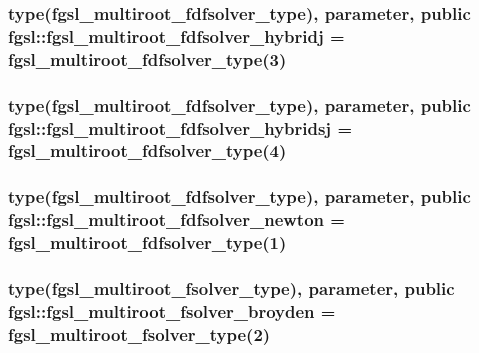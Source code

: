 \hypertarget{classfgsl_a3a3728bb3d1d1a699c08a4a02af2eac1}{
\subsubsection[{fgsl\-\_\-multiroot\-\_\-fdfsolver\-\_\-hybridj}]{\setlength{\rightskip}{0pt plus 5cm}type({\bf fgsl\-\_\-multiroot\-\_\-fdfsolver\-\_\-type}), parameter, public fgsl\-::fgsl\-\_\-multiroot\-\_\-fdfsolver\-\_\-hybridj = {\bf fgsl\-\_\-multiroot\-\_\-fdfsolver\-\_\-type}(3)}}\label{classfgsl_a3a3728bb3d1d1a699c08a4a02af2eac1}
\hypertarget{classfgsl_a4d6c0533915b025bbb86fb16727964ca}{
\subsubsection[{fgsl\-\_\-multiroot\-\_\-fdfsolver\-\_\-hybridsj}]{\setlength{\rightskip}{0pt plus 5cm}type({\bf fgsl\-\_\-multiroot\-\_\-fdfsolver\-\_\-type}), parameter, public fgsl\-::fgsl\-\_\-multiroot\-\_\-fdfsolver\-\_\-hybridsj = {\bf fgsl\-\_\-multiroot\-\_\-fdfsolver\-\_\-type}(4)}}\label{classfgsl_a4d6c0533915b025bbb86fb16727964ca}
\hypertarget{classfgsl_ae80cc34511a1cc786b0fb5617e3929ed}{
\subsubsection[{fgsl\-\_\-multiroot\-\_\-fdfsolver\-\_\-newton}]{\setlength{\rightskip}{0pt plus 5cm}type({\bf fgsl\-\_\-multiroot\-\_\-fdfsolver\-\_\-type}), parameter, public fgsl\-::fgsl\-\_\-multiroot\-\_\-fdfsolver\-\_\-newton = {\bf fgsl\-\_\-multiroot\-\_\-fdfsolver\-\_\-type}(1)}}\label{classfgsl_ae80cc34511a1cc786b0fb5617e3929ed}
\hypertarget{classfgsl_aaa51198ecabbc2cc4e7cd469492acedc}{
\subsubsection[{fgsl\-\_\-multiroot\-\_\-fsolver\-\_\-broyden}]{\setlength{\rightskip}{0pt plus 5cm}type({\bf fgsl\-\_\-multiroot\-\_\-fsolver\-\_\-type}), parameter, public fgsl\-::fgsl\-\_\-multiroot\-\_\-fsolver\-\_\-broyden = {\bf fgsl\-\_\-multiroot\-\_\-fsolver\-\_\-type}(2)}}\label{classfgsl_aaa51198ecabbc2cc4e7cd469492acedc}
